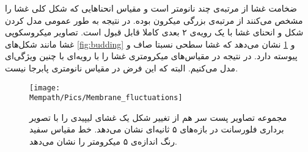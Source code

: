 
ضخامت غشا از مرتبه‌ی چند نانومتر است و مقیاس انحنا‌هایی که شکل کلی غشا را مشخص می‌کنند از مرتبه‌ی بزرگی میکرون بوده. در نتیجه به طور عمومی مدل کردن شکل و انحنای غشا با یک رویه‌ی ۲ بعدی کاملا قابل قبول است. تصاویر میکروسکوپی غشا مانند شکل‌های 
\ref{fig:budding}
و
\ref{fig:flucmem} 
نشان می‌دهد که غشا سطحی نسبتا صاف و پیوسته دارد. در نتیجه در مقیاس‌های میکرومتری غشا را با رویه‌ای با چنین ویژگی‌ای مدل می‌کنیم. البته که این فرض در مقیاس نانومتری پابرجا نیست. 

\begin{figure}[t]
\begin{center}
\texttt{[image: \\Mempath/Pics/Membrane\_fluctuations]}
\caption{
مجموعه تصاویر پست سر هم از تغییر شکل یک غشای لیپیدی را با تصویر برداری فلورسانت در بازه‌های ۵ ثانیه‌ای نشان می‌دهد. خط مقیاس سفید رنگ اندازه‌ی ۵ میکرومتر را نشان می‌دهد. 
\cite{ParthasarathyMembraneMeasurement}
}
\label{fig:flucmem}
\end{center}
\end{figure}

